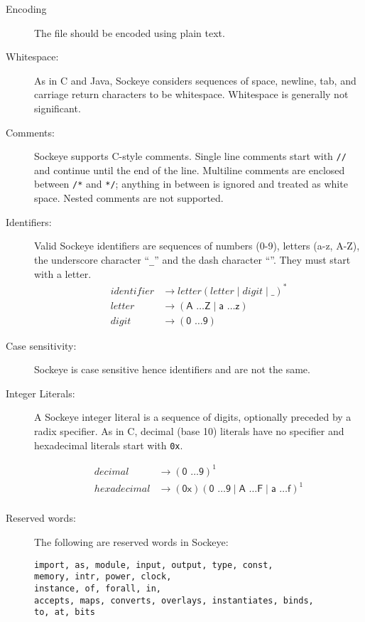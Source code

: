 \documentclass[a4paper,11pt,twoside]{report}
\begin{document}
{{{\begin{description}
\item[Encoding] The file should be encoded using plain text.
\item[Whitespace:]  As in C and Java, Sockeye considers sequences of
  space, newline, tab, and carriage return characters to be
  whitespace.  Whitespace is generally not significant. 

\item[Comments:] Sockeye supports C-style comments.  Single line comments
  start with \texttt{//} and continue until the end of the line.
  Multiline comments are enclosed between \texttt{/*} and \texttt{*/};
  anything in between is ignored and treated as white space.
  Nested comments are not supported.

\item[Identifiers:] Valid Sockeye identifiers are sequences of numbers
  (0-9), letters (a-z, A-Z), the underscore character ``\texttt{\_}'' and the dash character ``\textendash''. They
  must start with a letter.
  \begin{align*}
  identifier & \rightarrow letter (letter \mid digit \mid \text{\_})^{\textrm{*}} \\
  letter & \rightarrow (\textsf{A \ldots Z} \mid  \textsf{a \ldots z})\\
  digit & \rightarrow (\textsf{0 \ldots 9})
    \end{align*}

\item[Case sensitivity:] Sockeye is case sensitive hence identifiers  and  are not the same.
  
\item[Integer Literals:] A Sockeye integer literal is a sequence of
  digits, optionally preceded by a radix specifier.  As in C, decimal (base 10)
  literals have no specifier and hexadecimal literals start with
  \texttt{0x}.

\begin{align*}
decimal & \rightarrow (\textsf{0 \ldots 9})^{\textrm{1}}\\
hexadecimal & \rightarrow (\textsf{0x})(\textsf{0 \ldots 9} \mid \textsf{A \ldots F} \mid \textsf{a \ldots f})^{\textrm{1}}\\
\end{align*}

\item[Reserved words:] The following are reserved words in Sockeye:
\begin{verbatim}
import, as, module, input, output, type, const,
memory, intr, power, clock,
instance, of, forall, in,
accepts, maps, converts, overlays, instantiates, binds,
to, at, bits
\end{verbatim}


\end{description}}}}
\end{document}
